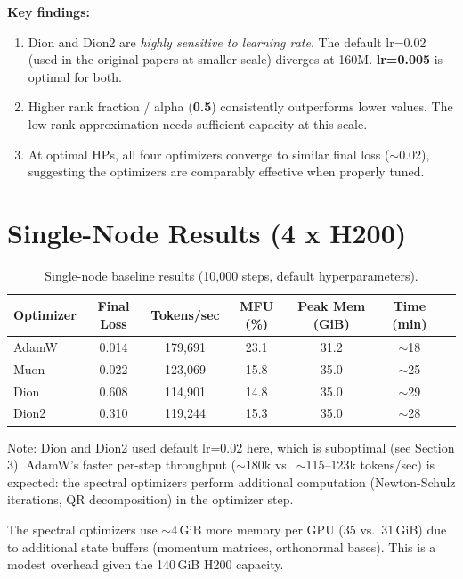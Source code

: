 \documentclass[11pt,a4paper]{article}
\begin{document}
\noindent\textbf{Key findings:}
\begin{enumerate}
    \item Dion and Dion2 are \emph{highly sensitive to learning rate}. The default lr=0.02 (used in the original papers at smaller scale) diverges at 160M. \textbf{lr=0.005} is optimal for both.
    \item Higher rank fraction / alpha (\textbf{0.5}) consistently outperforms lower values. The low-rank approximation needs sufficient capacity at this scale.
    \item At optimal HPs, all four optimizers converge to similar final loss ($\sim$0.02), suggesting the optimizers are comparably effective when properly tuned.
\end{enumerate}

\section{Single-Node Results (4 x H200)}

\begin{table}[H]
\centering
\caption{Single-node baseline results (10,000 steps, default hyperparameters).}
\label{tab:single}
\begin{tabular}{lcccccc}
\toprule
\textbf{Optimizer} & \textbf{Final Loss} & \textbf{Tokens/sec} & \textbf{MFU (\%)} & \textbf{Peak Mem (GiB)} & \textbf{Time (min)} \\
\midrule
AdamW & 0.014 & 179,691 & 23.1 & 31.2 & $\sim$18 \\
Muon  & 0.022 & 123,069 & 15.8 & 35.0 & $\sim$25 \\
Dion  & 0.608 & 114,901 & 14.8 & 35.0 & $\sim$29 \\
Dion2 & 0.310 & 119,244 & 15.3 & 35.0 & $\sim$28 \\
\bottomrule
\end{tabular}
\end{table}

Note: Dion and Dion2 used default lr=0.02 here, which is suboptimal (see Section 3). AdamW's faster per-step throughput ($\sim$180k vs.\ $\sim$115--123k tokens/sec) is expected: the spectral optimizers perform additional computation (Newton-Schulz iterations, QR decomposition) in the optimizer step.

The spectral optimizers use $\sim$4\,GiB more memory per GPU (35 vs.\ 31\,GiB) due to additional state buffers (momentum matrices, orthonormal bases). This is a modest overhead given the 140\,GiB H200 capacity.
\end{document}
